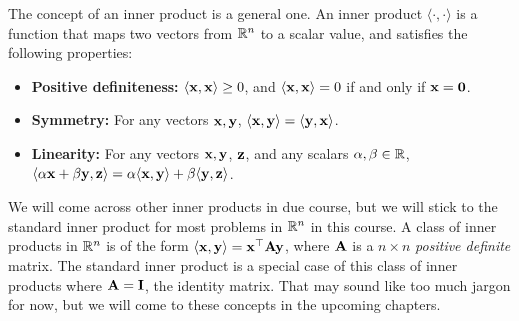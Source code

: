 The concept of an inner product is a general one. An inner product $\langle \cdot, \cdot \rangle$ is a function that maps two vectors from $\mathbb{R}^n$ to a scalar value, and satisfies the following properties:
\begin{itemize}
    \item \textbf{Positive definiteness:} $\langle \mathbf{x}, \mathbf{x} \rangle \geq 0$, and $\langle \mathbf{x}, \mathbf{x} \rangle = 0$ if and only if $\mathbf{x} = \mathbf{0}$.
    \item \textbf{Symmetry:} For any vectors $\mathbf{x}, \mathbf{y}$, $\langle \mathbf{x}, \mathbf{y} \rangle = \langle \mathbf{y}, \mathbf{x} \rangle$.
    \item \textbf{Linearity:} For any vectors $\mathbf{x}, \mathbf{y}$, $\mathbf{z}$, and any scalars $\alpha, \beta \in \mathbb{R}$, $\langle \alpha\mathbf{x} + \beta \mathbf{y}, \mathbf{z} \rangle = \alpha \langle \mathbf{x}, \mathbf{y}\rangle + \beta \langle \mathbf{y}, \mathbf{z}\rangle$.
\end{itemize}
We will come across other inner products in due course, but we will stick to the standard inner product for most problems in $\mathbb{R}^n$ in this course. A class of inner products in $\mathbb{R}^n$ is of the form $\langle \mathbf{x}, \mathbf{y}\rangle = \mathbf{x}^\top\mathbf{A}\mathbf{y}$, where $\mathbf{A}$ is a $n \times n$ \textit{positive definite} matrix. The standard inner product is a special case of this class of inner products where $\mathbf{A} = \mathbf{I}$, the identity matrix. That may sound like too much jargon for now, but we will come to these concepts in the upcoming chapters.

